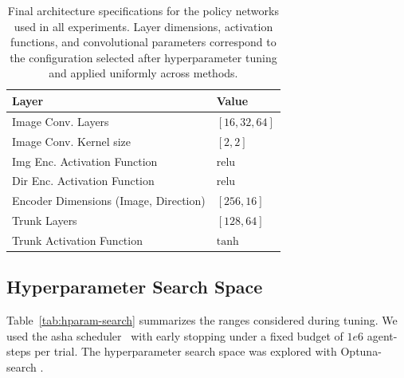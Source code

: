 \begin{table}[H]
    \centering
    \caption[Policy Network Parameters used for Implicit Indication Experiments.]{
        Final architecture specifications for the policy networks used in all experiments.
        Layer dimensions, activation functions, and convolutional parameters correspond to the 
        configuration selected after hyperparameter tuning and applied uniformly across methods.
    }
    \label{tab:policy_network}
    \begin{tabular}{l l}
        \toprule
        \textbf{Layer} & \textbf{Value} \\
        \midrule
        Image Conv. Layers & \([16, 32, 64]\) \\
        Image Conv. Kernel size & \([2,2]\) \\
        Img Enc. Activation Function & \(\text{relu}\) \\
        Dir Enc. Activation Function & \(\text{relu}\) \\
        Encoder Dimensions (Image, Direction) & \([256, 16]\) \\
        Trunk Layers & \([128, 64]\) \\
        Trunk Activation Function & \(\text{tanh}\) \\
        \bottomrule
    \end{tabular}
\end{table}

\subsection{Hyperparameter Search Space}
Table~\ref{tab:hparam-search} summarizes the ranges considered during tuning.
We used the \gls{asha} scheduler~\cite{li2018b} with early 
stopping under a fixed budget of \(1e6\) agent-steps per trial. 
The hyperparameter search space was explored with Optuna-search \cite{akiba2019}.


